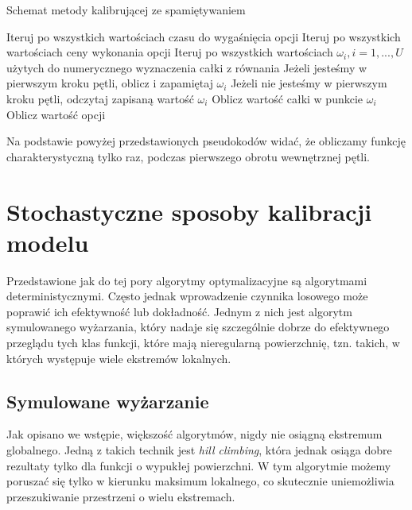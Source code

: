 \documentclass{pracamgr}
\begin{document}
\begin{algorithm}[H]
\caption{Schemat metody kalibrującej ze spamiętywaniem}\label{euclid}

\begin{algorithmic}[1]
  
  \State Iteruj po wszystkich wartościach czasu do wygaśnięcia opcji
  \State Iteruj po wszystkich wartościach ceny wykonania opcji
  \State Iteruj po wszystkich wartościach $\omega_i, i = 1, ..., U $ użytych do numerycznego wyznaczenia całki z równania   
  \State Jeżeli jesteśmy w pierwszym kroku pętli, oblicz i zapamiętaj $\omega_i$
  \State Jeżeli nie jesteśmy w pierwszym kroku pętli, odczytaj zapisaną wartość $\omega_i$
  \State Oblicz wartość całki w punkcie $\omega_i$
  \State Oblicz wartość opcji

\end{algorithmic}
\label{alg:simulatedAnnealing}
\end{algorithm}




Na podstawie powyżej przedstawionych pseudokodów widać, że obliczamy funkcję 
charakterystyczną tylko raz, podczas pierwszego obrotu wewnętrznej pętli.



\section{Stochastyczne sposoby kalibracji modelu}
Przedstawione jak do tej pory algorytmy optymalizacyjne są algorytmami deterministycznymi.
Często jednak wprowadzenie czynnika losowego może poprawić ich efektywność lub dokładność. Jednym z
nich jest algorytm symulowanego wyżarzania, który nadaje się szczególnie dobrze do efektywnego
przeglądu tych klas funkcji, które mają nieregularną powierzchnię, tzn. takich, w których występuje
wiele ekstremów lokalnych.

\subsection{Symulowane wyżarzanie}

Jak opisano we wstępie, większość algorytmów, nigdy nie osiągną ekstremum
globalnego. Jedną z takich technik jest \textit{hill climbing}, która jednak 
osiąga dobre rezultaty tylko dla funkcji o wypukłej powierzchni. W tym algorytmie możemy poruszać się
tylko w kierunku maksimum lokalnego, co skutecznie uniemożliwia przeszukiwanie przestrzeni o wielu
ekstremach.
\end{document}
